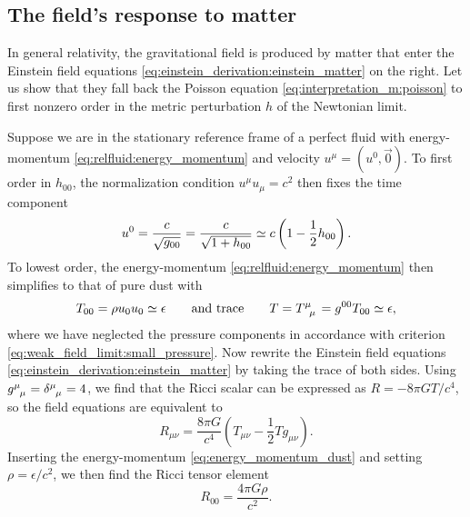 \subsection{The field's response to matter}
\label{sec:einstein_to_poisson}

In general relativity, the gravitational field is produced by matter that enter the Einstein field equations \eqref{eq:einstein_derivation:einstein_matter} on the right.
Let us show that they fall back the Poisson equation \eqref{eq:interpretation_m:poisson} to first nonzero order in the metric perturbation $h$ of the Newtonian limit.

Suppose we are in the stationary reference frame of a perfect fluid with energy-momentum \eqref{eq:relfluid:energy_momentum} and velocity $u^\mu = (u^0, \vec{0})$.
To first order in $h_{00}$, the normalization condition $u^\mu u_\mu = c^2$ then fixes the time component
\begin{equation}
	u^0 = \frac{c}{\sqrt{g_{00}}} = \frac{c}{\sqrt{1 + h_{00}}} \simeq c \left( 1 - \frac12 h_{00} \right) .
\end{equation}
To lowest order, the energy-momentum \eqref{eq:relfluid:energy_momentum} then simplifies to that of pure dust with
\begin{equation}
	T_{00} = \rho u_0 u_0 \taylor \epsilon
	\qquad \text{and trace} \qquad
	T = T\indices{^\mu_\mu} = g^{00} T_{00} \taylor \epsilon, 
\label{eq:energy_momentum_dust}
\end{equation}
where we have neglected the pressure components in accordance with criterion \eqref{eq:weak_field_limit:small_pressure}.
Now rewrite the Einstein field equations \eqref{eq:einstein_derivation:einstein_matter} by taking the trace of both sides.
Using $g\indices{^\mu_\mu} = \delta\indices{^\mu_\mu} = 4$, we find that the Ricci scalar can be expressed as $R = - 8 \pi G T / c^4$, so the field equations are equivalent to
\begin{equation}
	R_{\mu \nu} = \frac{8 \pi G}{c^4} \left( T_{\mu \nu} - \frac12 T g_{\mu \nu} \right) .
	\label{eq:einstein_rewritten}
\end{equation}
Inserting the energy-momentum \eqref{eq:energy_momentum_dust} and setting $\rho = \epsilon / c^2$, we then find the Ricci tensor element
\begin{equation}
	R_{00} = \frac{4 \pi G \rho}{c^2} .
	\label{eq:weak_field_limit:ricci_from_energy_momentum}
\end{equation}

